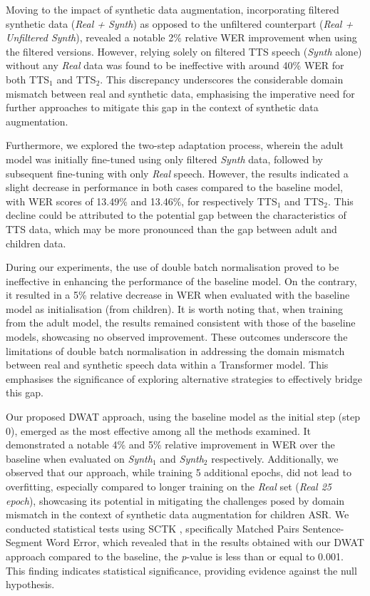 Moving to the impact of synthetic data augmentation, incorporating filtered synthetic data (\textit{Real +  Synth}) as opposed to the unfiltered counterpart (\textit{Real + Unfiltered Synth}), revealed a notable 2\% relative \ac{WER} improvement when using the filtered versions. However, relying solely on filtered \ac{TTS} speech (\textit{Synth} alone) without any \textit{Real} data was found to be ineffective with around 40\% \ac{WER} for both TTS$_1$ and TTS$_2$. This discrepancy underscores the considerable domain mismatch between real and synthetic data, emphasising the imperative need for further approaches to mitigate this gap in the context of synthetic data augmentation.

Furthermore, we explored the two-step adaptation process, wherein the adult model was initially fine-tuned using only filtered \textit{Synth} data, followed by subsequent fine-tuning with only \textit{Real} speech. However, the results indicated a slight decrease in performance in both cases compared to the baseline model, with \ac{WER} scores of 13.49\% and 13.46\%, for respectively TTS$_1$ and TTS$_2$. This decline could be attributed to the potential gap between the characteristics of \ac{TTS} data, which may be more pronounced than the gap between adult and children data.


During our experiments, the use of double batch normalisation proved to be ineffective in enhancing the performance of the baseline model. On the contrary, it resulted in a 5\% relative decrease in \ac{WER}  when evaluated with the baseline model as initialisation (from children). It is worth noting that, when training from the adult model, the results remained consistent with those of the baseline models, showcasing no observed improvement. These outcomes underscore the limitations of double batch normalisation in addressing the domain mismatch between real and synthetic speech data within a Transformer model. This emphasises the significance of exploring alternative strategies to effectively bridge this gap.


Our proposed \ac{DWAT} approach, using the baseline model as the initial step (step 0), emerged as the most effective among all the methods examined. It demonstrated a notable 4\% and 5\% relative improvement in \ac{WER} over the baseline when evaluated on \textit{Synth$_1$} and \textit{Synth$_2$} respectively. Additionally, we observed that our approach, while training 5 additional epochs, did not lead to overfitting, especially compared to longer training on the \textit{Real} set (\textit{Real 25 epoch}), showcasing its potential in mitigating the challenges posed by domain mismatch in the context of synthetic data augmentation for children \ac{ASR}. We conducted statistical tests using SCTK \cite{SCTK_nist}, specifically Matched Pairs Sentence-Segment Word Error, which revealed that in the results obtained with our \ac{DWAT} approach compared to the baseline, the \textit{p}-value is less than or equal to 0.001. This finding indicates statistical significance, providing evidence against the null hypothesis.


